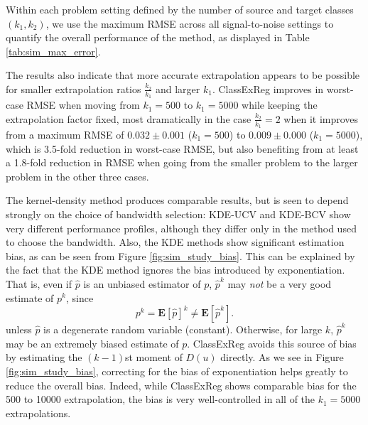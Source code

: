 \documentclass[twoside,11pt]{article}
\newcommand{\E}{\textbf{E}}
\begin{document}
Within each problem setting defined by the number of
source and target classes $(k_1,k_2)$, we use the maximum RMSE across
all signal-to-noise settings to quantify the overall performance of
the method, as displayed in Table \ref{tab:sim_max_error}.

The results also indicate that more accurate extrapolation
appears to be possible for smaller extrapolation ratios
$\frac{k_2}{k_1}$ and larger $k_1$.
ClassExReg improves in worst-case RMSE when moving from $k_1 =500$ to $k_1 = 5000$ while keeping the extrapolation factor fixed, most dramatically in the case $\frac{k_2}{k_1} = 2$ when it improves from a
maximum RMSE of $0.032\pm0.001$ ($k_1 = 500$) to $0.009 \pm 0.000$ ($k_1 = 5000$), which is 3.5-fold reduction in worst-case RMSE, but
also benefiting from at least a 1.8-fold reduction in RMSE when going from
the smaller problem to the larger problem in the other three cases.

The kernel-density method produces comparable results, but is seen to depend strongly on the choice of bandwidth selection: KDE-UCV and KDE-BCV show very different performance profiles, although they differ only in the method used to choose the bandwidth.
Also, the KDE methods show significant estimation bias, as can be seen from Figure \ref{fig:sim_study_bias}.  
This can be explained by the fact that
the KDE method ignores the bias introduced by exponentiation.
That is, even if $\hat{p}$ is an unbiased estimator of $p$, $\hat{p}^k$ may \emph{not} be a very good estimate of $p^k$, since
\[
p^k = \E[\hat{p}]^k \neq \E[\hat{p}^k].
\]
unless $\hat{p}$ is a degenerate random variable
(constant). Otherwise, for large $k$, $\hat{p}^k$ may be an extremely
biased estimate of $p$.  ClassExReg avoids this source of
bias by estimating the $(k-1)$st moment of $D(u)$ directly.  As we see
in Figure \ref{fig:sim_study_bias}, correcting for the bias of
exponentiation helps greatly to reduce the overall bias.   Indeed, while
ClassExReg shows comparable bias for the 500 to 10000 extrapolation,
the bias is very well-controlled in all of the $k_1 = 5000$ extrapolations.
\end{document}
